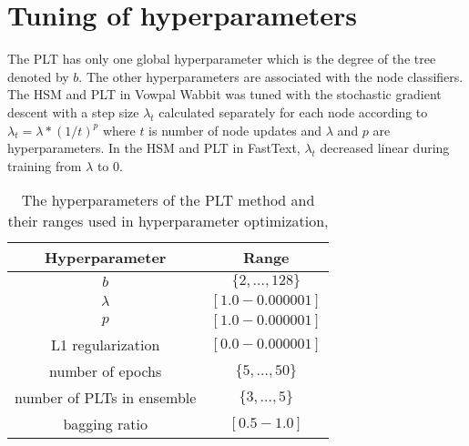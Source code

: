 \documentclass{article}
\newcommand{\Algo}[1]{\textsc{#1}}
\newcommand{\tableBefore}{-0pt}
\newcommand{\tableAfter}{-0pt}
\begin{document}
\section{Tuning of hyperparameters}
\label{sec:hyper}

The \Algo{PLT} has only one global hyperparameter which is the degree of the tree denoted by $b$.
The other hyperparameters are associated with the node classifiers.
The \Algo{HSM} and \Algo{PLT} in Vowpal Wabbit was tuned with the stochastic gradient descent with a step size $\lambda_t$ calculated separately for each node
according to $\lambda_t = \lambda * (1 / t)^p$ where $t$ is number of node updates and $\lambda$ and $p$ are hyperparameters.
In the \Algo{HSM} and \Algo{PLT} in FastText, $\lambda_t$ decreased linear during training from $\lambda$ to 0.

\vspace{\tableBefore}
\begin{table}[ht!]
\caption{The hyperparameters of the \Algo{PLT} method and their ranges used in hyperparameter optimization,}
\label{tab:hyppar}
\begin{center}
\begin{tabular}{c|c}
\hline
Hyperparameter & Range \\
\hline
$b$ & $\{ 2, \dots , 128\}$ \\
$\lambda$ & $[1.0 - 0.000001]$ \\
$p$ & $[1.0 - 0.000001]$ \\
L1 regularization & $[0.0 - 0.000001]$ \\
number of epochs & $\{ 5, \dots , 50\}$ \\
number of PLTs in ensemble & $\{ 3, \dots , 5\}$ \\
bagging ratio & $[0.5 - 1.0]$ \\
\hline
\end{tabular}
\end{center}
\end{table}
\vspace{\tableAfter}
\end{document}
